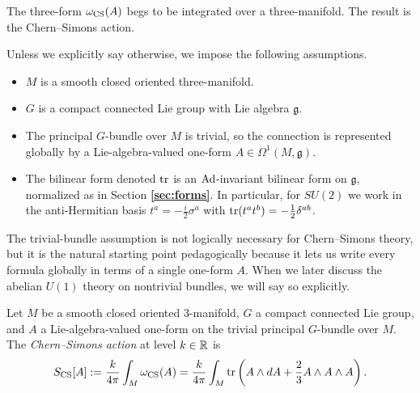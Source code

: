 The three-form $\omega_{\operatorname{CS}}(A)$ begs to be integrated over a three-manifold.  The result is the Chern--Simons action.

\begin{assumption}\label{ass:standing-CS}
Unless we explicitly say otherwise, we impose the following assumptions.
\begin{itemize}
\item $M$ is a smooth closed oriented three-manifold.
\item $G$ is a compact connected Lie group with Lie algebra $\mathfrak{g}$.
\item The principal $G$-bundle over $M$ is trivial, so the connection is represented globally by a Lie-algebra-valued one-form $A\in \Omega^1(M,\mathfrak{g})$.
\item The bilinear form denoted $\operatorname{tr}$ is an $\operatorname{Ad}$-invariant bilinear form on $\mathfrak{g}$, normalized as in Section \textbf{\ref{sec:forms}}. In particular, for $SU(2)$ we work in the anti-Hermitian basis $t^a = -\tfrac{i}{2}\sigma^a$ with $\operatorname{tr}(t^at^b) = -\tfrac{1}{2}\delta^{ab}$.
\end{itemize}
\end{assumption}

\noindent The trivial-bundle assumption is not logically necessary for Chern--Simons theory, but it is the natural starting point pedagogically because it lets us write every formula globally in terms of a single one-form $A$. When we later discuss the abelian $U(1)$ theory on nontrivial bundles, we will say so explicitly.

\begin{definition}\label{def:CS-action}
Let $M$ be a smooth closed oriented 3-manifold, $G$ a compact connected Lie group, and $A$ a Lie-algebra-valued one-form on the trivial principal $G$-bundle over $M$. The \emph{Chern--Simons action} at level $k\in \mathbb{R}$ is
\begin{equation}\label{eq:CS-action}
S_{\operatorname{CS}}[A] := \frac{k}{4\pi}\int_M \omega_{\operatorname{CS}}(A) = \frac{k}{4\pi}\int_M \operatorname{tr}\left(A\wedge dA + \frac{2}{3}A\wedge A\wedge A\right).
\end{equation}
\end{definition}

